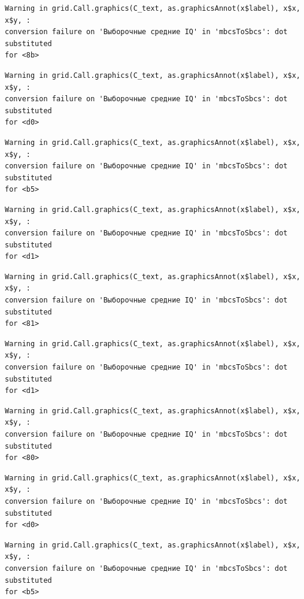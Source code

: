 \documentclass[
  letterpaper,
]{scrbook}
\theoremstyle{definition}
\theoremstyle{remark}
\begin{document}
\begin{verbatim}
Warning in grid.Call.graphics(C_text, as.graphicsAnnot(x$label), x$x, x$y, :
conversion failure on 'Выборочные средние IQ' in 'mbcsToSbcs': dot substituted
for <8b>
\end{verbatim}

\begin{verbatim}
Warning in grid.Call.graphics(C_text, as.graphicsAnnot(x$label), x$x, x$y, :
conversion failure on 'Выборочные средние IQ' in 'mbcsToSbcs': dot substituted
for <d0>
\end{verbatim}

\begin{verbatim}
Warning in grid.Call.graphics(C_text, as.graphicsAnnot(x$label), x$x, x$y, :
conversion failure on 'Выборочные средние IQ' in 'mbcsToSbcs': dot substituted
for <b5>
\end{verbatim}

\begin{verbatim}
Warning in grid.Call.graphics(C_text, as.graphicsAnnot(x$label), x$x, x$y, :
conversion failure on 'Выборочные средние IQ' in 'mbcsToSbcs': dot substituted
for <d1>
\end{verbatim}

\begin{verbatim}
Warning in grid.Call.graphics(C_text, as.graphicsAnnot(x$label), x$x, x$y, :
conversion failure on 'Выборочные средние IQ' in 'mbcsToSbcs': dot substituted
for <81>
\end{verbatim}

\begin{verbatim}
Warning in grid.Call.graphics(C_text, as.graphicsAnnot(x$label), x$x, x$y, :
conversion failure on 'Выборочные средние IQ' in 'mbcsToSbcs': dot substituted
for <d1>
\end{verbatim}

\begin{verbatim}
Warning in grid.Call.graphics(C_text, as.graphicsAnnot(x$label), x$x, x$y, :
conversion failure on 'Выборочные средние IQ' in 'mbcsToSbcs': dot substituted
for <80>
\end{verbatim}

\begin{verbatim}
Warning in grid.Call.graphics(C_text, as.graphicsAnnot(x$label), x$x, x$y, :
conversion failure on 'Выборочные средние IQ' in 'mbcsToSbcs': dot substituted
for <d0>
\end{verbatim}

\begin{verbatim}
Warning in grid.Call.graphics(C_text, as.graphicsAnnot(x$label), x$x, x$y, :
conversion failure on 'Выборочные средние IQ' in 'mbcsToSbcs': dot substituted
for <b5>
\end{verbatim}
\end{document}

